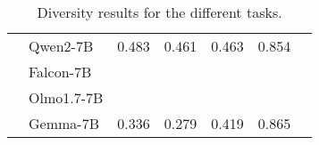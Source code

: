 \begin{table*}[ht]
{\begin{tabular}{@{}lllllll@{}}
                                                                           & Qwen2-7B   & 0.483      & 0.461     & 0.463 & 0.854 &  \\
                                                                           & Falcon-7B  &            &           &       &       &  \\
                                                                           & Olmo1.7-7B &            &           &       &       &  \\
                                                                           & Gemma-7B   & 0.336      & 0.279     & 0.419 & 0.865 & 
\end{tabular}
}
\caption{Diversity results for the different tasks.}
\label{tab:results}
\end{table*}
